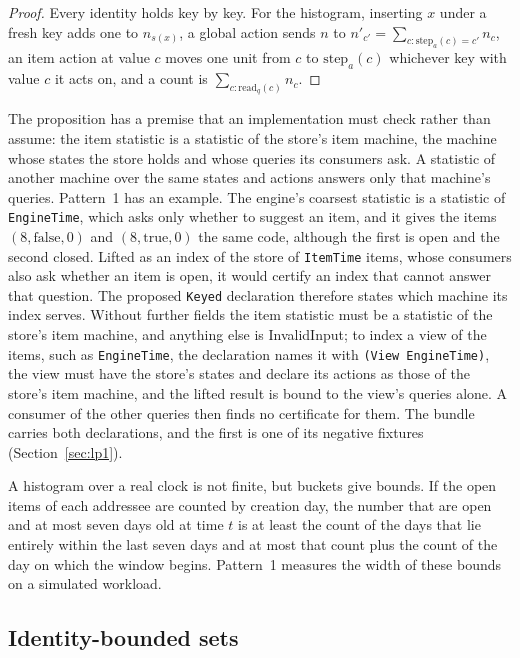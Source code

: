 \documentclass[11pt]{article}
\newcommand{\code}[1]{\texttt{#1}}
\newcommand{\step}{\mathrm{step}}
\newcommand{\rd}{\mathrm{read}}
\theoremstyle{definition}
\theoremstyle{plain}
\begin{document}
\begin{proof}
Every identity holds key by key. For the histogram, inserting $x$ under a fresh key adds one to
$n_{s(x)}$, a global action sends $n$ to $n'_{c'}=\sum_{c:\step_a(c)=c'}n_c$, an item action at
value $c$ moves one unit from $c$ to $\step_a(c)$ whichever key with value $c$ it acts on, and a
count is $\sum_{c:\rd_q(c)}n_c$.
\end{proof}

The proposition has a premise that an implementation must check rather than assume: the item
statistic is a statistic of the store's item machine, the machine whose states the store holds and
whose queries its consumers ask. A statistic of another machine over the same states and actions
answers only that machine's queries. Pattern~1 has an example. The engine's coarsest statistic is a
statistic of \code{EngineTime}, which asks only whether to suggest an item, and it gives the items
$(8,\mathrm{false},0)$ and $(8,\mathrm{true},0)$ the same code, although the first is open and the
second closed. Lifted as an index of the store of \code{ItemTime} items, whose consumers also ask
whether an item is open, it would certify an index that cannot answer that question. The proposed
\code{Keyed} declaration therefore states which machine its index serves. Without further fields
the item statistic must be a statistic of the store's item machine, and anything else is
InvalidInput; to index a view of the items, such as \code{EngineTime}, the declaration names it with
\code{(View EngineTime)}, the view must have the store's states and declare its actions as those of
the store's item machine, and the lifted result is bound to the view's queries alone. A consumer of
the other queries then finds no certificate for them. The bundle carries both declarations, and the
first is one of its negative fixtures (Section~\ref{sec:lp1}).

A histogram over a real clock is not finite, but buckets give bounds. If the open items of each
addressee are counted by creation day, the number that are open and at most seven days old at time
$t$ is at least the count of the days that lie entirely within the last seven days and at most that
count plus the count of the day on which the window begins. Pattern~1 measures the width of these
bounds on a simulated workload.

\subsection{Identity-bounded sets}\label{sec:dk}
\end{document}
